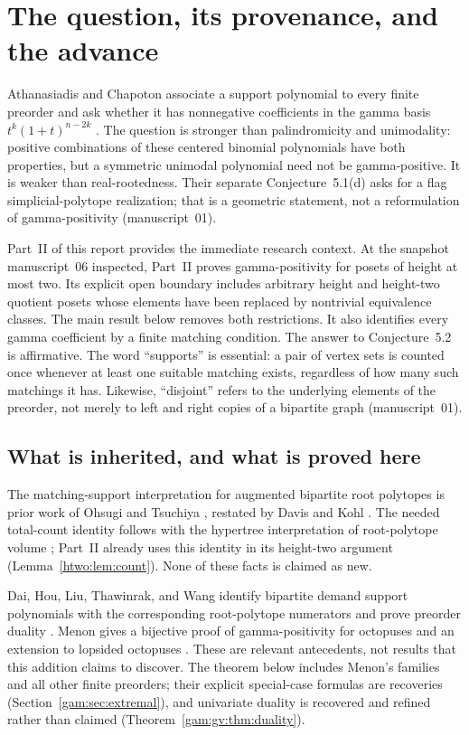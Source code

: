 \documentclass[11pt]{article}
\numberwithin{equation}{section}
\theoremstyle{definition}
\begin{document}
\section{The question, its provenance, and the advance}\label{gam:sec:context}
Athanasiadis and Chapoton associate a support polynomial to every finite
preorder and ask whether it has nonnegative coefficients in the gamma basis
$t^k(1+t)^{n-2k}$ \cite[Conjecture~5.2]{AC}. The question is stronger than
palindromicity and unimodality: positive combinations of these centered
binomial polynomials have both properties, but a symmetric unimodal
polynomial need not be gamma-positive. It is weaker than real-rootedness.
Their separate Conjecture~5.1(d) asks for a flag simplicial-polytope
realization; that is a geometric statement, not a reformulation of
gamma-positivity (manuscript~01).

Part~II of this report provides the immediate research context. At the
snapshot manuscript~06 inspected, Part~II proves gamma-positivity for posets
of height at most two. Its explicit open boundary includes arbitrary height
and height-two quotient posets whose elements have been replaced by
nontrivial equivalence classes. The main result below removes both
restrictions. It also identifies every gamma coefficient by a finite
matching condition. The answer to Conjecture~5.2 is affirmative. The word
``supports'' is essential: a pair of vertex sets is counted once whenever at
least one suitable matching exists, regardless of how many such matchings it
has. Likewise, ``disjoint'' refers to the underlying elements of the
preorder, not merely to left and right copies of a bipartite graph
(manuscript~01).

\subsection{What is inherited, and what is proved here}
The matching-support interpretation for augmented bipartite root polytopes
is prior work of Ohsugi and Tsuchiya \cite[Propositions~3.3--3.4]{OT20},
restated by Davis and Kohl \cite[Theorem~3.10]{DK}. The needed total-count
identity follows with the hypertree interpretation of root-polytope volume
\cite{KP}; Part~II already uses this identity in its height-two
argument (Lemma~\ref{htwo:lem:count}). None of these facts is claimed as new.

Dai, Hou, Liu, Thawinrak, and Wang identify bipartite demand support
polynomials with the corresponding root-polytope numerators and prove
preorder duality \cite[Theorems~1.2--1.3]{DHLTW}. Menon gives a bijective
proof of gamma-positivity for octopuses and an extension to lopsided
octopuses \cite{Menon}. These are relevant antecedents, not results that
this addition claims to discover. The theorem below includes Menon's
families and all other finite preorders; their explicit special-case
formulas are recoveries (Section~\ref{gam:sec:extremal}), and univariate
duality is recovered and refined rather than claimed
(Theorem~\ref{gam:gv:thm:duality}).
\end{document}
